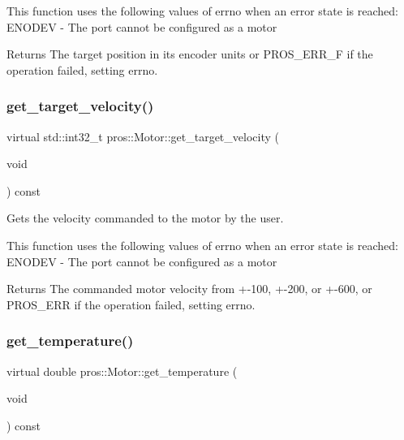 This function uses the following values of errno when an error state is reached\+: E\+N\+O\+D\+EV -\/ The port cannot be configured as a motor

\begin{DoxyReturn}{Returns}
The target position in its encoder units or P\+R\+O\+S\+\_\+\+E\+R\+R\+\_\+F if the operation failed, setting errno. 
\end{DoxyReturn}
\mbox{\label{classpros_1_1Motor_a8b8148a179cfadd579c8d4c82eb5873f}} 
\subsubsection{\texorpdfstring{get\+\_\+target\+\_\+velocity()}{get\_target\_velocity()}}
{\footnotesize\ttfamily virtual std\+::int32\+\_\+t pros\+::\+Motor\+::get\+\_\+target\+\_\+velocity (\begin{DoxyParamCaption}\item[{void}]{ }\end{DoxyParamCaption}) const\hspace{0.3cm}{\ttfamily [virtual]}}

Gets the velocity commanded to the motor by the user.

This function uses the following values of errno when an error state is reached\+: E\+N\+O\+D\+EV -\/ The port cannot be configured as a motor

\begin{DoxyReturn}{Returns}
The commanded motor velocity from +-\/100, +-\/200, or +-\/600, or P\+R\+O\+S\+\_\+\+E\+RR if the operation failed, setting errno. 
\end{DoxyReturn}
\mbox{\label{classpros_1_1Motor_a9fd793251b91c2ac0091c65f290f740d}} 
\subsubsection{\texorpdfstring{get\+\_\+temperature()}{get\_temperature()}}
{\footnotesize\ttfamily virtual double pros\+::\+Motor\+::get\+\_\+temperature (\begin{DoxyParamCaption}\item[{void}]{ }\end{DoxyParamCaption}) const\hspace{0.3cm}{\ttfamily [virtual]}}

